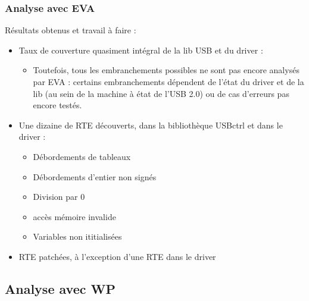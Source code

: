 \documentclass[french]{beamer}
\begin{document}

 \begin{frame}
 \frametitle{Analyse avec EVA}

 Résultats obtenus et travail à faire :
 \begin{itemize}
 	\item Taux de couverture quasiment intégral de la lib USB et du driver :
 		\begin{itemize}
 			\item \justifyit Toutefois, tous les embranchements possibles ne sont pas encore analysés par EVA : certains embranchements dépendent de l'état du driver et de la lib (au sein de la machine à état de l'USB 2.0) ou de cas d'erreurs pas encore testés.
 		\end{itemize}

 	\item Une dizaine de RTE découverts, dans la bibliothèque USBctrl et dans le driver :
 		\begin{itemize}
 			\item Débordements de tableaux
 			\item Débordements d'entier non signés
 			\item Division par 0
 			\item accès mémoire invalide
 			\item Variables non ititialisées
 		\end{itemize}
 	\item RTE patchées, à l'exception d'une RTE dans le driver
 \end{itemize}


 \end{frame}


 \subsection{Analyse avec WP}
\end{document}
